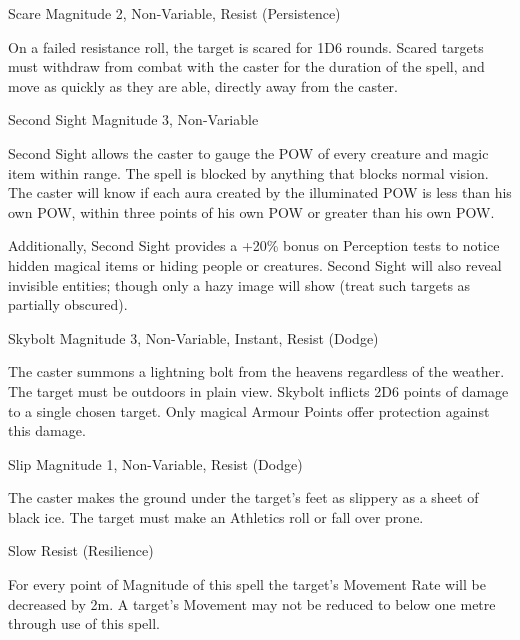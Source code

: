 \begin{rpg-spell}
{Scare}
{Magnitude 2, Non-Variable, Resist (Persistence)}

On a failed resistance roll, the target is scared for 1D6 rounds. Scared targets must withdraw from combat with the caster for the duration of the spell, and move as quickly as they are able, directly away from the caster.
\end{rpg-spell}


\begin{rpg-spell}
{Second Sight}
{Magnitude 3, Non-Variable}

Second Sight allows the caster to gauge the POW of every creature and magic item within range. The spell is blocked by anything that blocks normal vision. The caster will know if each aura created by the illuminated POW is less than his own POW, within three points of his own POW or greater than his own POW. 

Additionally, Second Sight provides a +20\% bonus on Perception tests to notice hidden magical items or hiding people or creatures. Second Sight will also reveal invisible entities; though only a hazy image will show (treat such targets as partially obscured). 
\end{rpg-spell}



\begin{rpg-spell}
{Skybolt}
{Magnitude 3, Non-Variable, Instant, Resist (Dodge)}

The caster summons a lightning bolt from the heavens regardless of the weather. The target must be outdoors in plain view. Skybolt inflicts 2D6 points of damage to a single chosen target. Only magical Armour Points offer protection against this damage.
\end{rpg-spell}


\begin{rpg-spell}
{Slip}
{Magnitude 1, Non-Variable, Resist (Dodge)}

The caster makes the ground under the target’s feet as slippery as a sheet of black ice. The target must make an Athletics roll or fall over prone.
\end{rpg-spell}


\begin{rpg-spell}
{Slow}
{Resist (Resilience)}

For every point of Magnitude of this spell the target’s Movement Rate will be decreased by 2m. A target’s Movement may not be reduced to below one metre through use of this spell. 
\end{rpg-spell}


